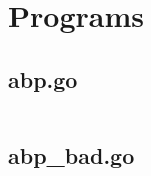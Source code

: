 \section{Programs}\label{sec:prog}

\subsection{abp.go}\label{sec:abp-prog}
\begin{verbatim}
\end{verbatim}

\subsection{abp\_bad.go}\label{sec:bad-abp-prog}
\begin{verbatim}
\end{verbatim}
